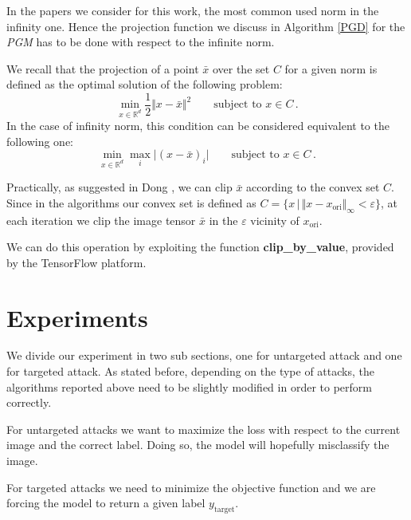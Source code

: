 \documentclass[10pt,twocolumn,letterpaper, english]{article}
\theoremstyle{definition}
\theoremstyle{plain}
\theoremstyle{plain}
\theoremstyle{plain}
\theoremstyle{plain}
\theoremstyle{remark}
\theoremstyle{remark}
\theoremstyle{definition}
\theoremstyle{definition}
\theoremstyle{definition}
\theoremstyle{definition}
\renewcommand{\epsilon}{\varepsilon}
\begin{document}
In the papers we consider for this work, the most common used norm in the infinity one. 
Hence the projection function we discuss in Algorithm \ref{PGD} for the \textit{PGM} has to be done with respect to the infinite norm. 

We recall that the projection of a point $\bar{x}$ over the set $C$ for a given norm is defined as the optimal solution of the following problem: 
\begin{equation*}
    \min_{x \in \mathbb{R}^d} \frac{1}{2} \Vert x - \bar{x} \Vert^2 \qquad \text{subject to } x \in C\,.
\end{equation*}
In the case of infinity norm, this condition can be considered equivalent to the following one: 
\begin{equation*}
    \min_{x \in \mathbb{R}^d}  \max_i \vert (x - \bar{x})_i \vert \qquad \text{subject to } x \in C\,.
\end{equation*}

Practically, as suggested in Dong \cite{momentum}, we can clip $\bar{x}$ according to the convex set $C$. 
Since in the algorithms our convex set is defined as $C = \{ x \,|\, \Vert x - x_{\text{ori}} \Vert_\infty < \epsilon \}$, at each iteration we clip the image tensor $\bar{x}$ in the $\epsilon$ vicinity of $x_{\text{ori}}$. 

We can do this operation by exploiting the function \textbf{clip\_by\_value}, provided by the TensorFlow platform. 


\section{Experiments}
We divide our experiment in two sub sections, one for untargeted attack and one for targeted attack. As stated before, depending on the type of attacks, the algorithms reported above need to be slightly modified in order to perform correctly.

For untargeted attacks we want to maximize the loss with respect to the current image and the correct label. Doing so, the model will hopefully misclassify the image.

For targeted attacks we need to minimize the objective function and we are forcing the model to return a given label $y_{\text{target}}$.
\end{document}
